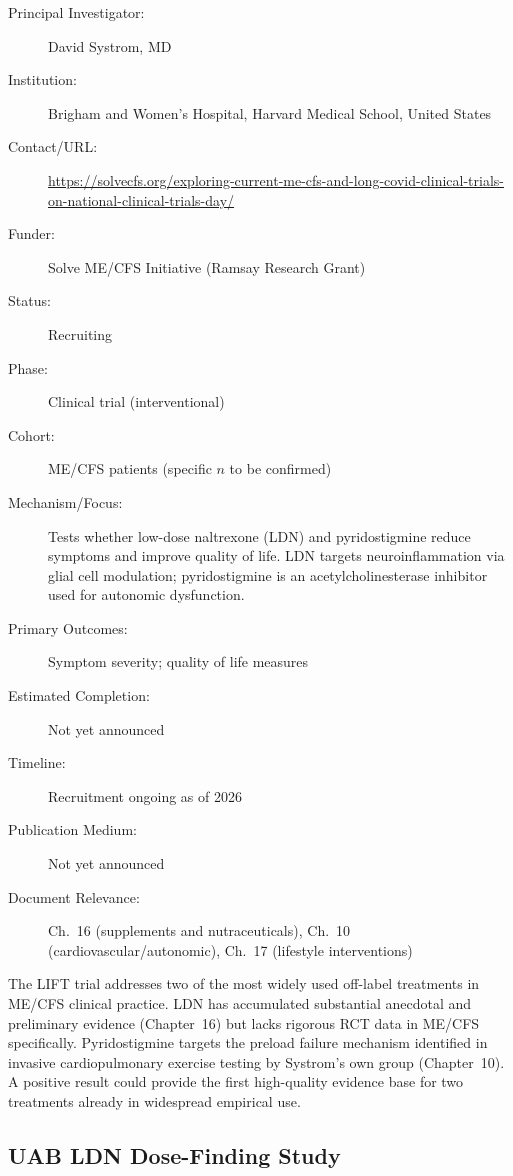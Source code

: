 \begin{description}
    \item[Principal Investigator:] David Systrom, MD
    \item[Institution:] Brigham and Women's Hospital, Harvard Medical School,
        United States
    \item[Contact/URL:] \url{https://solvecfs.org/exploring-current-me-cfs-and-long-covid-clinical-trials-on-national-clinical-trials-day/}
    \item[Funder:] Solve ME/CFS Initiative (Ramsay Research Grant)
    \item[Status:] Recruiting
    \item[Phase:] Clinical trial (interventional)
    \item[Cohort:] ME/CFS patients (specific $n$ to be confirmed)
    \item[Mechanism/Focus:] Tests whether low-dose naltrexone (LDN) and
        pyridostigmine reduce symptoms and improve quality of life.  LDN
        targets neuroinflammation via glial cell modulation; pyridostigmine
        is an acetylcholinesterase inhibitor used for autonomic dysfunction.
    \item[Primary Outcomes:] Symptom severity; quality of life measures
    \item[Estimated Completion:] Not yet announced
    \item[Timeline:] Recruitment ongoing as of 2026
    \item[Publication Medium:] Not yet announced
    \item[Document Relevance:] Ch.~16 (supplements and nutraceuticals),
        Ch.~10 (cardiovascular/autonomic), Ch.~17 (lifestyle interventions)
\end{description}

The LIFT trial addresses two of the most widely used off-label treatments in
ME/CFS clinical practice.  LDN has accumulated substantial anecdotal and
preliminary evidence (Chapter~16) but lacks rigorous RCT data in ME/CFS
specifically.  Pyridostigmine targets the preload failure mechanism identified
in invasive cardiopulmonary exercise testing by Systrom's own group
(Chapter~10).  A positive result could provide the first high-quality evidence
base for two treatments already in widespread empirical use.

\subsection{UAB LDN Dose-Finding Study}
\label{sec:registry-uab-ldn}

